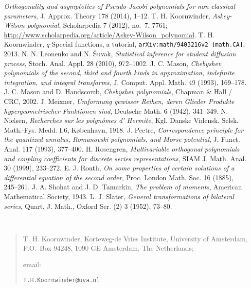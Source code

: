 \documentclass[twoside,11pt]{article}
\begin{document}
\begin{thebibliography}{999}
{\em Orthogonality and asymptotics of Pseudo-Jacobi polynomials for 
 non-classical parameters},
J. Approx. Theory 178 (2014), 1--12.
%
T. H. Koornwinder, {\em Askey-Wilson polynomial}, Scholarpedia 7 (2012), no.~7,
7761;\\
 \url{http://www.scholarpedia.org/article/Askey-Wilson_polynomial}.
%
T. H. Koornwinder,
{$q$-Special functions, a tutorial},
{\tt arXiv:math/9403216v2 [math.CA]}, 2013.
 N. N. Leonenko and N. \v{S}uvak,
{\em Statistical inference for student diffusion process},
Stoch. Anal. Appl. 28 (2010), 972--1002.
%
J. C. Mason, 
{\em Chebyshev polynomials of the second, third and fourth kinds in
approximation, indefinite integration, and integral transforms},
J. Comput. Appl. Math. 49 (1993), 169--178.
%
J. C. Mason and D. Handscomb,
{\em Chebyshev polynomials},
Chapman \& Hall / CRC, 2002.
%
J. Meixner,
{\em Umformung gewisser Reihen, deren Glieder Produkte hypergeometrischer 
Funktionen sind},
Deutsche Math.  6 (1942),  341--349.
%
N. Nielsen,
{\em Recherches sur les polyn\^omes d' Hermite},
Kgl. Danske Vidensk. Selsk. Math.-Fys. Medd. I.6, K\o benhavn, 1918.
%
J. Peetre,
{\em Correspondence principle for the quantized annulus, Romanovski  polynomials,
and Morse potential},
J. Funct. Anal.  117 (1993), 377--400.
%
H. Rosengren,
{\em Multivariable orthogonal polynomials and coupling coefficients for 
discrete series representations},
SIAM J. Math. Anal.  30  (1999),  233--272.
%
E. J. Routh,
{\em On some properties of certain solutions of a differential equation of the second order},
Proc. London Math. Soc. 16 (1885), 245--261.
%
J. A. Shohat and J. D. Tamarkin,
{\em The problem of moments},
American Mathematical Society, 1943.
%
L. J. Slater,
{\em General transformations of bilateral series},
Quart. J. Math., Oxford Ser. (2) 3 (1952), 73--80.
%
\end{thebibliography}
\quad\\
\begin{footnotesize}
\begin{quote}
{T. H. Koornwinder, Korteweg-de Vries Institute, University of Amsterdam,\\
P.O.\ Box 94248, 1090 GE Amsterdam, The Netherlands;

\vspace{\smallskipamount}
email: }{\tt T.H.Koornwinder@uva.nl}
\end{quote}
\end{footnotesize}
\end{document}
